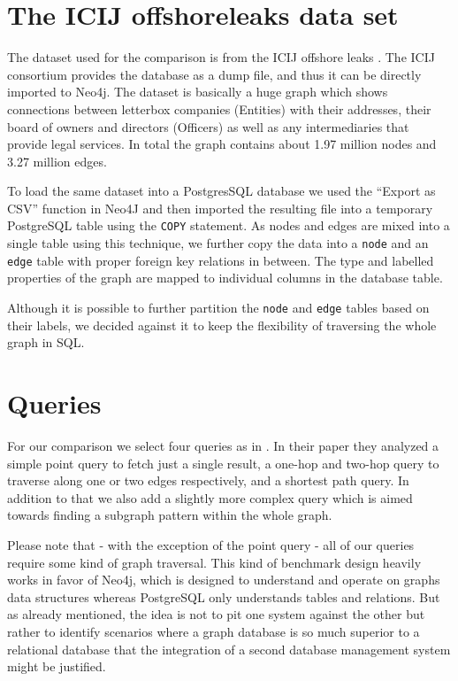 \documentclass[11pt, a4paper,oneside,chapterprefix=false]{scrbook}
\begin{document}
\section{The ICIJ offshoreleaks data set} \label{sec:dataset}

The dataset used for the comparison is from the ICIJ offshore leaks \cite{offshoreleaks}.
The ICIJ consortium provides the database as a dump file, and thus it can be directly imported to Neo4j.
The dataset is basically a huge graph which shows connections between letterbox companies (Entities) with their addresses, their board of owners and directors (Officers) as well as any intermediaries that provide legal services. In total the graph contains about  1.97 million nodes and 3.27 million edges.

To load the same dataset into a PostgresSQL database we used the ``Export as CSV'' function in Neo4J and then imported the resulting file into a temporary PostgreSQL table using the \lstinline{COPY} statement.
As nodes and edges are mixed into a single table using this technique, we further copy the data into a \lstinline{node} and an \lstinline{edge} table with proper foreign key relations in between.
The type and labelled properties of the graph are mapped to individual columns in the database table.

Although it is possible to further partition the \lstinline{node} and \lstinline{edge} tables based on their labels, we decided against it to keep the flexibility of traversing the whole graph in SQL.

\section{Queries} \label{sec:benchmark}

For our comparison we select four queries as in \cite{graphdbbenchmark}.
In their paper they analyzed a simple point query to fetch just a single result, a one-hop and two-hop query to traverse along one or two edges respectively, and a shortest path query.
In addition to that we also add a slightly more complex query which is aimed towards finding a subgraph pattern within the whole graph.

Please note that - with the exception of the point query - all of our queries require some kind of graph traversal.
This kind of benchmark design heavily works in favor of Neo4j, which is designed to understand and operate on graphs data structures whereas PostgreSQL only understands tables and relations.
But as already mentioned, the idea is not to pit one system against the other but rather to identify scenarios where a graph database is so much superior to a relational database that the integration of a second database management system might be justified.
\end{document}
